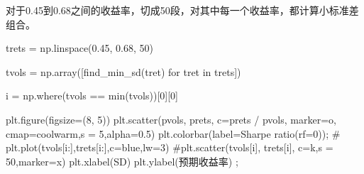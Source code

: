 \documentclass[
  letterpaper,
  DIV=11,
  numbers=noendperiod]{scrreprt}
\newenvironment{Shaded}{\begin{snugshade}}{\end{snugshade}}
\newcommand{\BuiltInTok}[1]{\textcolor[rgb]{0.00,0.23,0.31}{#1}}
\newcommand{\CommentTok}[1]{\textcolor[rgb]{0.37,0.37,0.37}{#1}}
\newcommand{\ControlFlowTok}[1]{\textcolor[rgb]{0.00,0.23,0.31}{#1}}
\newcommand{\DecValTok}[1]{\textcolor[rgb]{0.68,0.00,0.00}{#1}}
\newcommand{\FloatTok}[1]{\textcolor[rgb]{0.68,0.00,0.00}{#1}}
\newcommand{\KeywordTok}[1]{\textcolor[rgb]{0.00,0.23,0.31}{#1}}
\newcommand{\NormalTok}[1]{\textcolor[rgb]{0.00,0.23,0.31}{#1}}
\newcommand{\OperatorTok}[1]{\textcolor[rgb]{0.37,0.37,0.37}{#1}}
\newcommand{\StringTok}[1]{\textcolor[rgb]{0.13,0.47,0.30}{#1}}
\begin{document}
对于0.45到0.68之间的收益率，切成50段，对其中每一个收益率，都计算小标准差组合。

\begin{Shaded}
\begin{Highlighting}[]
\NormalTok{trets }\OperatorTok{=}\NormalTok{ np.linspace(}\FloatTok{0.45}\NormalTok{, }\FloatTok{0.68}\NormalTok{, }\DecValTok{50}\NormalTok{) }

\NormalTok{tvols }\OperatorTok{=}\NormalTok{ np.array([find\_min\_sd(tret) }\ControlFlowTok{for}\NormalTok{ tret }\KeywordTok{in}\NormalTok{ trets])}
\end{Highlighting}
\end{Shaded}

\begin{Shaded}
\begin{Highlighting}[]
\NormalTok{i }\OperatorTok{=}\NormalTok{ np.where(tvols }\OperatorTok{==} \BuiltInTok{min}\NormalTok{(tvols))[}\DecValTok{0}\NormalTok{][}\DecValTok{0}\NormalTok{]}
\end{Highlighting}
\end{Shaded}

\begin{Shaded}
\begin{Highlighting}[]
\NormalTok{plt.figure(figsize}\OperatorTok{=}\NormalTok{(}\DecValTok{8}\NormalTok{, }\DecValTok{5}\NormalTok{)) }
\NormalTok{plt.scatter(pvols, prets, c}\OperatorTok{=}\NormalTok{prets }\OperatorTok{/}\NormalTok{ pvols, }
\NormalTok{            marker}\OperatorTok{=}\StringTok{\textquotesingle{}o\textquotesingle{}}\NormalTok{, cmap}\OperatorTok{=}\StringTok{\textquotesingle{}coolwarm\textquotesingle{}}\NormalTok{,s }\OperatorTok{=} \DecValTok{5}\NormalTok{,alpha}\OperatorTok{=}\FloatTok{0.5}\NormalTok{) }
\NormalTok{plt.colorbar(label}\OperatorTok{=}\StringTok{\textquotesingle{}Sharpe ratio(rf=0)\textquotesingle{}}\NormalTok{)}\OperatorTok{;}  \CommentTok{\# }
\NormalTok{plt.plot(tvols[i:],trets[i:],c}\OperatorTok{=}\StringTok{\textquotesingle{}blue\textquotesingle{}}\NormalTok{,lw}\OperatorTok{=}\DecValTok{3}\NormalTok{)}
\CommentTok{\#plt.scatter(tvols[i], trets[i], c=\textquotesingle{}k\textquotesingle{},s = 50,marker=\textquotesingle{}x\textquotesingle{})}
\NormalTok{plt.xlabel(}\StringTok{\textquotesingle{}SD\textquotesingle{}}\NormalTok{) }
\NormalTok{plt.ylabel(}\StringTok{\textquotesingle{}预期收益率\textquotesingle{}}\NormalTok{) }\OperatorTok{;}
\end{Highlighting}
\end{Shaded}
\end{document}
